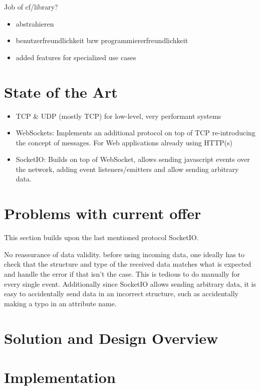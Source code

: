 \documentclass[conference]{IEEEtran}
\begin{document}
Job of cf/library?

\begin{itemize}
    \item abstrahieren
    \item benutzerfreundlichkeit bzw programmiererfreundlichkeit
    \item added features for specialized use cases
\end{itemize}


\section{State of the Art}

\begin{itemize}
    \item TCP \& UDP (mostly TCP) for low-level, very performant systems
    \item WebSockets: Implements an additional protocol on top of TCP re-introducing the concept of messages. For Web applications already using HTTP(s)
    \item SocketIO: Builds on top of WebSocket, allows sending javascript events over the network, adding event listeners/emitters and allow sending arbitrary data.
\end{itemize}

\section{Problems with current offer}

This section builds upon the last mentioned protocol SocketIO.

No reassurance of data validity. before using incoming data, one ideally has to check that the structure and type of the received data matches what is expected and handle the error if that isn't the case. This is tedious to do manually for every single event. Additionally since SocketIO allows sending arbitrary data, it is easy to accidentally send data in an incorrect structure, such as accidentally making a typo in an attribute name.






\section{Solution and Design Overview}

\section{Implementation}
\end{document}
